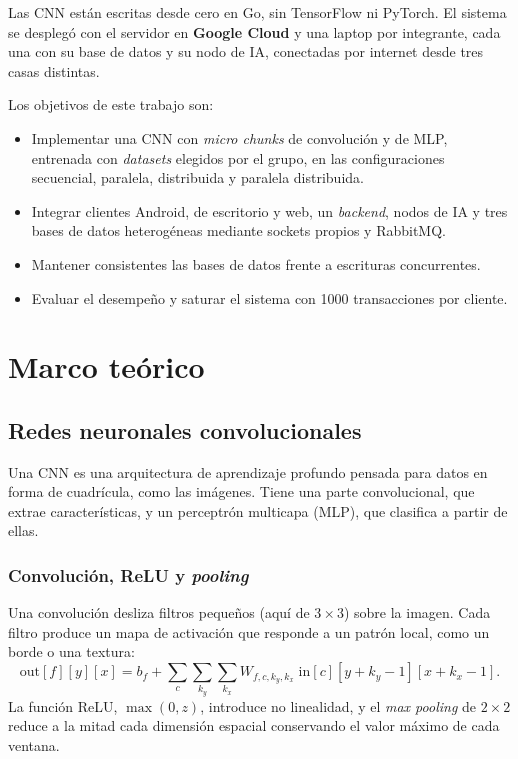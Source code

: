 \documentclass[10pt,a4paper]{article}
\begin{document}
Las CNN están escritas desde cero en Go, sin TensorFlow ni PyTorch. El sistema se desplegó con el
servidor en \textbf{Google Cloud} y una laptop por integrante, cada una con su base de datos y su nodo
de IA, conectadas por internet desde tres casas distintas.

Los objetivos de este trabajo son:
\begin{itemize}
    \item Implementar una CNN con \textit{micro chunks} de convolución y de MLP, entrenada con
    \textit{datasets} elegidos por el grupo, en las configuraciones secuencial, paralela, distribuida
    y paralela distribuida.
    \item Integrar clientes Android, de escritorio y web, un \textit{backend}, nodos de IA y tres bases
    de datos heterogéneas mediante sockets propios y RabbitMQ.
    \item Mantener consistentes las bases de datos frente a escrituras concurrentes.
    \item Evaluar el desempeño y saturar el sistema con 1000 transacciones por cliente.
\end{itemize}

\section{Marco teórico}

\subsection{Redes neuronales convolucionales}

Una CNN es una arquitectura de aprendizaje profundo pensada para datos en forma de cuadrícula, como
las imágenes. Tiene una parte convolucional, que extrae características, y un perceptrón multicapa
(MLP), que clasifica a partir de ellas.

\subsubsection{Convolución, ReLU y \textit{pooling}}

Una convolución desliza filtros pequeños (aquí de $3 \times 3$) sobre la imagen. Cada filtro produce un
mapa de activación que responde a un patrón local, como un borde o una textura:
\[
\mathrm{out}[f][y][x] = b_f + \sum_{c}\sum_{k_y}\sum_{k_x} W_{f,c,k_y,k_x}\;
\mathrm{in}[c][y+k_y-1][x+k_x-1].
\]
La función ReLU, $\max(0,z)$, introduce no linealidad, y el \textit{max pooling} de $2 \times 2$ reduce
a la mitad cada dimensión espacial conservando el valor máximo de cada ventana.
\end{document}
